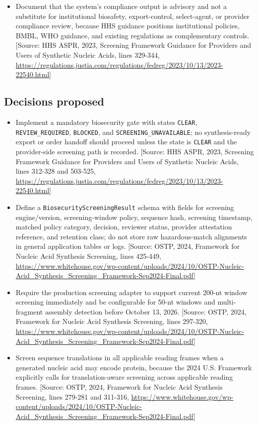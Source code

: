 \documentclass[11pt]{report}
\begin{document}
\begin{itemize}
\item Document that the system's compliance output is advisory and not a substitute for institutional biosafety, export-control, select-agent, or provider compliance review, because HHS guidance positions institutional policies, BMBL, WHO guidance, and existing regulations as complementary controls. [Source: HHS ASPR, 2023, Screening Framework Guidance for Providers and Users of Synthetic Nucleic Acids, lines 329-344, \url{https://regulations.justia.com/regulations/fedreg/2023/10/13/2023-22540.html}]
\end{itemize}

\subsection{Decisions proposed}
\begin{itemize}
\item Implement a mandatory biosecurity gate with states \texttt{CLEAR}, \texttt{REVIEW\_REQUIRED}, \texttt{BLOCKED}, and \texttt{SCREENING\_UNAVAILABLE}; no synthesis-ready export or order handoff should proceed unless the state is \texttt{CLEAR} and the provider-side screening path is recorded. [Source: HHS ASPR, 2023, Screening Framework Guidance for Providers and Users of Synthetic Nucleic Acids, lines 312-328 and 503-525, \url{https://regulations.justia.com/regulations/fedreg/2023/10/13/2023-22540.html}]
\item Define a \texttt{BiosecurityScreeningResult} schema with fields for screening engine/version, screening-window policy, sequence hash, screening timestamp, matched policy category, decision, reviewer status, provider attestation reference, and retention class; do not store raw hazardous-match alignments in general application tables or logs. [Source: OSTP, 2024, Framework for Nucleic Acid Synthesis Screening, lines 425-449, \url{https://www.whitehouse.gov/wp-content/uploads/2024/10/OSTP-Nucleic-Acid_Synthesis_Screening_Framework-Sep2024-Final.pdf}]
\item Require the production screening adapter to support current 200-nt window screening immediately and be configurable for 50-nt windows and multi-fragment assembly detection before October 13, 2026. [Source: OSTP, 2024, Framework for Nucleic Acid Synthesis Screening, lines 297-320, \url{https://www.whitehouse.gov/wp-content/uploads/2024/10/OSTP-Nucleic-Acid_Synthesis_Screening_Framework-Sep2024-Final.pdf}]
\item Screen sequence translations in all applicable reading frames when a generated nucleic acid may encode protein, because the 2024 U.S. Framework explicitly calls for translation-aware screening across applicable reading frames. [Source: OSTP, 2024, Framework for Nucleic Acid Synthesis Screening, lines 279-281 and 311-316, \url{https://www.whitehouse.gov/wp-content/uploads/2024/10/OSTP-Nucleic-Acid_Synthesis_Screening_Framework-Sep2024-Final.pdf}]

\end{itemize}
\end{document}
